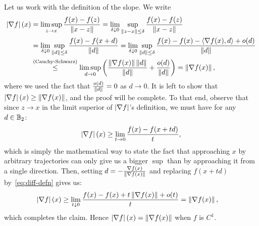 \documentclass[10pt]{article}
\begin{document}
\begin{Exercise}
	Let us work with the definition of the slope. We write
	\begin{align*}
		\left| \nabla f \right|(x) &= \limsup_{z \to x} \frac{f(x) - f(z)}{\left \| x - z \right \|}
		= \lim_{\delta \downarrow 0} \sup_{\left \| z - x \right \| \leq \delta} \frac{f(x) -
		f(z)}{\left \| x - z \right \|} \\
			&= \lim_{\delta \downarrow 0} \sup_{\left \| d \right \| \leq \delta}
			\frac{f(x) - f(x + d)}{\left \| d \right \|} =
				\lim_{\delta \downarrow 0} \sup_{\left \| d \right \| \leq \delta}
			\frac{f(x) - f(x) - \left\langle \nabla f(x), d \right\rangle + o(d)}{\left \| d \right \|} \\
			&\overset{(\text{Cauchy-Schwarz})}{\leq} \limsup_{d \to 0} \left(
				\frac{\left \| \nabla f(x) \right \| \left \| d \right \|}{\left \| d \right \|} +
			  	\frac{o(d)}{\left \| d \right \|} \right) = \left \| \nabla f(x) \right \|,
	\end{align*}
	where we used the fact that $\frac{o(d)}{\left \| d \right \|} = 0$ as $d \to 0$.
	It is left to show that $\left| \nabla f \right|(x) \geq \left \| \nabla f(x) \right \|$, and the
	proof will be complete. To that end, observe that since $z \to x$ in the
	limit superior of $\left| \nabla f \right|$'s definition, we must have for any
	$d \in \mathbb{B}_2$:
	\[
		\left| \nabla f \right|(x) \geq \lim_{t \to 0} \frac{f(x) - f(x + td)}{t},
	\]
	which is simply the mathematical way to state the fact that approaching $x$
	by arbitrary trajectories can only give us a bigger $\sup$ than by
	approaching it from a single direction. Then, setting $d = -\frac{\nabla
	f(x)}{\left \| \nabla f(x) \right \|}$ and replacing $f(x + td)$ by~\cref{eq:diff-defn}
	gives us:
	\begin{align*}
		\left| \nabla f \right|(x) &\geq
		\lim_{t \downarrow 0} \frac{f(x) - f(x) + t \left \| \nabla f(x) \right \| + o(t)}{t}
			= \left \| \nabla f(x) \right \|,
	\end{align*}
	which completes the claim. Hence $\left| \nabla f \right|(x) = \left \| \nabla f(x) \right \|$
	when $f$ is $C^1$.
\end{Exercise}
\end{document}
